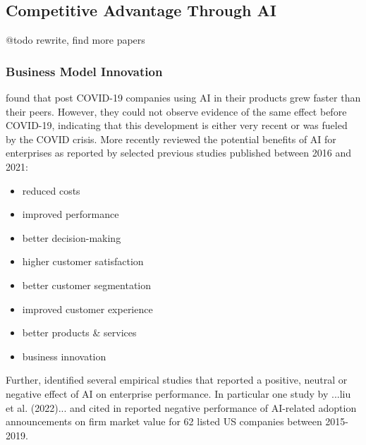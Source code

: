 %
%


\subsection{Competitive Advantage Through AI}

{\color{purple} @todo rewrite, find more papers}

\subsubsection{Business Model Innovation}

\cite{}


\cite{xuCanArtificialIntelligence2021} found that post COVID-19 companies using AI in their products grew
faster than their peers. However, they could not observe evidence of the same effect before COVID-19, indicating
that this development is either very recent or was fueled by the COVID crisis. More recently
\cite{hoArtificialIntelligenceFirm2022} reviewed the potential benefits of AI for enterprises as reported
by selected previous studies published between 2016 and 2021:

\begin{itemize}
    \item reduced costs
    \item improved performance
    \item better decision-making
    \item higher customer satisfaction
    \item better customer segmentation
    \item improved customer experience
    \item better products \& services
    \item business innovation
\end{itemize}

Further, \cite{hoArtificialIntelligenceFirm2022} identified several empirical studies that reported a positive,
neutral or negative effect of AI on enterprise performance. In particular one study by ...liu et al. (2022)...
and cited in \cite{hoArtificialIntelligenceFirm2022} reported negative performance of AI-related adoption 
announcements on firm market value for 62 listed US companies between 2015-2019.

